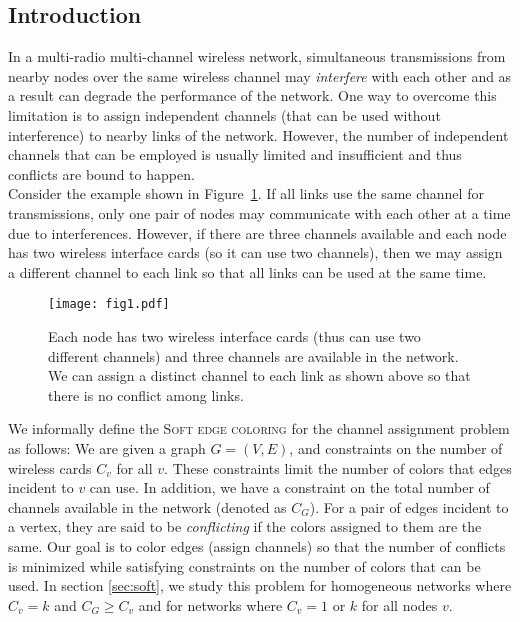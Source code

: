 \documentclass[titlepage, 11pt]{article}
\newcommand{\B}{\vspace*{-\smallskipamount}}
\begin{document}
\subsection{Introduction}
In a  multi-radio multi-channel wireless network, simultaneous transmissions from nearby nodes over the same wireless channel may \emph{interfere} with each other and as a result can degrade the performance of the network.
One way to overcome this limitation is to assign independent channels (that can be used without interference) to nearby links of the network. However, the number of independent channels that can be employed is usually limited and insufficient and thus conflicts are bound to happen.\\
\B 
Consider the example shown in Figure~\ref{fig:3node}.
If all links use the same channel for transmissions, only one 
pair of nodes may communicate with each other at a time
due to interferences.  However, if there are three channels available 
and each node has two wireless interface cards (so 
it can use two channels), then we may assign a different channel to each link so that all links can be used at the same time. 

\begin{figure}[h]
\begin{center}
    \centerline{\texttt{[image: fig1.pdf]}}
    \caption{\small Each node has two wireless interface cards 
(thus can use two different channels) and three channels are available in the network.
	We can assign a distinct channel to each link as shown above so that 
there is no conflict among links.
\label{fig:3node}}
\vspace{-0.3in}
\end{center}
\end{figure}

We informally define the \textsc{Soft edge coloring} for the channel assignment  problem as follows:
We are given a graph $G = (V, E)$, and constraints on the number of 
wireless cards $C_v$ for all $v$. These constraints limit the number
of colors that edges incident to $v$ can use. 
In addition, we have a constraint on the total number
of channels available in the network (denoted as $C_G$).
For a pair of edges incident to a vertex, they are said to be {\em conflicting} 
if the colors assigned to them are the same.
Our goal is to color edges (assign channels) so that
the number of conflicts is minimized while satisfying 
constraints on the number of colors that can be used. 
In section \ref{sec:soft}, we study this problem for homogeneous networks where $C_v = k$
and $C_G \ge C_v$  and for networks  where $C_v = 1$ or $k$ for all nodes $v$. \\
\end{document}
